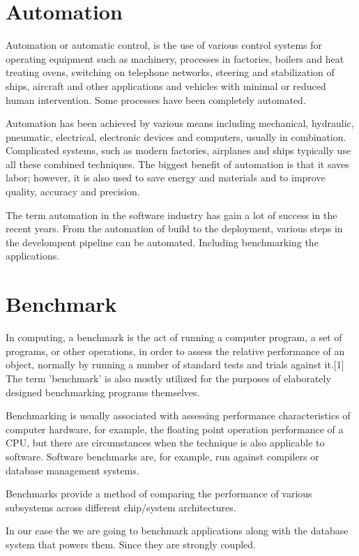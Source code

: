\section{Automation}
Automation or automatic control, is the use of various control systems for
operating equipment such as machinery, processes in factories, boilers and heat
treating ovens, switching on telephone networks, steering and stabilization of
ships, aircraft and other applications and vehicles with minimal or reduced
human intervention. Some processes have been completely automated.

Automation has been achieved by various means including mechanical, hydraulic,
pneumatic, electrical, electronic devices and computers, usually in combination.
Complicated systems, such as modern factories, airplanes and ships typically use
all these combined techniques. The biggest benefit of automation is that it
saves labor; however, it is also used to save energy and materials and to
improve quality, accuracy and precision.

The term automation in the software industry has gain a lot of success in the
recent years. From the automation of build to the deployment, various steps
in the develompent pipeline can be automated. Including benchmarking the
applications.

\section{Benchmark}
In computing, a benchmark is the act of running a computer program, a set of
programs, or other operations, in order to assess the relative performance of an
object, normally by running a number of standard tests and trials against it.[1]
The term 'benchmark' is also mostly utilized for the purposes of elaborately
designed benchmarking programs themselves.

Benchmarking is usually associated with assessing performance characteristics of
computer hardware, for example, the floating point operation performance of a
CPU, but there are circumstances when the technique is also applicable to
software. Software benchmarks are, for example, run against compilers or
database management systems.

Benchmarks provide a method of comparing the performance of various subsystems
across different chip/system architectures.

In our case the we are going to benchmark applications along with the database
system that powers them. Since they are strongly coupled.

